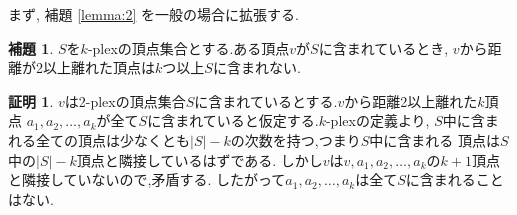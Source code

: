 \documentclass{thesis}
\theoremstyle{definition}
\newtheorem{lemma}{補題}[chapter]
\newtheorem*{prf*}{証明}
\begin{document}
まず, 補題  \ref{lemma:2} を一般の場合に拡張する.

\begin{lemma} \label{lemma:3}
$S$を$k$-plexの頂点集合とする.ある頂点$v$が$S$に含まれているとき,
$v$から距離が2以上離れた頂点は$k$つ以上$S$に含まれない.
\begin{prf*}
$v$は2-plexの頂点集合$S$に含まれているとする.$v$から距離2以上離れた$k$頂点
$a_{1}, a_{2}, \dots, a_{k}$が全て$S$に含まれていると仮定する.$k$-plexの定義より,
$S$中に含まれる全ての頂点は少なくとも$|S| - k$の次数を持つ,つまり$S$中に含まれる
頂点は$S$中の$|S| - k$頂点と隣接しているはずである.
しかし$v$は$v, a_{1}, a_{2}, \dots, a_{k}$の$k + 1$頂点と隣接していないので,矛盾する.
したがって$a_{1}, a_{2}, \dots, a_{k}$は全て$S$に含まれることはない.
\end{prf*}
\end{lemma}
\end{document}
